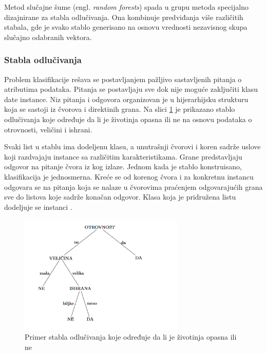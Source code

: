 Metod slučajne šume (engl. \textit{random forests}) spada u grupu metoda specijalno dizajnirane za stabla odlučivanja. Ona kombinuje predviđanja više različitih stabala, gde je svako stablo generisano na osnovu vrednosti nezavisnog skupa slučajno odabranih vektora.

\subsubsection{Stabla odlučivanja}
 
Problem klasifikacije rešava se postavljanjem pažljivo sastavljenih pitanja o atributima podataka. Pitanja se postavljaju sve dok nije moguće zaključiti klasu date instance. Niz pitanja i odgovora organizovan je u hijerarhijsku strukturu koja se sastoji iz čvorova i direktinih grana. Na slici \ref{fig:tree} je prikazano stablo odlučivanja koje određuje da li je životinja opasna ili ne na osnovu podataka o otrovnosti, veličini i ishrani. 

Svaki list u stablu ima dodeljenu klasu, a unutrašnji čvorovi i koren sadrže uslove koji razdvajaju instance sa različitim karakteristikama. Grane predstavljaju odgovor na pitanje čvora iz kog izlaze. Jednom kada je stablo konstruisano, klasifikacija je jednosmerna. Kreće se od korenog čvora i za konkretnu instancu odgovara se na pitanja koja se nalaze u čvorovima praćenjem odgovarajućih grana sve do listova koje sadrže konačan odgovor. Klasa koja je pridružena listu dodeljuje se instanci \cite{introDM}.


\begin{figure}[h]
	\centering
	\includegraphics[width=0.7\textwidth]{Figures/tree.png}
	\caption{Primer stabla odlučivanja koje određuje da li je životinja opasna ili ne \cite{vi}}
	\label{fig:tree}
\end{figure}



